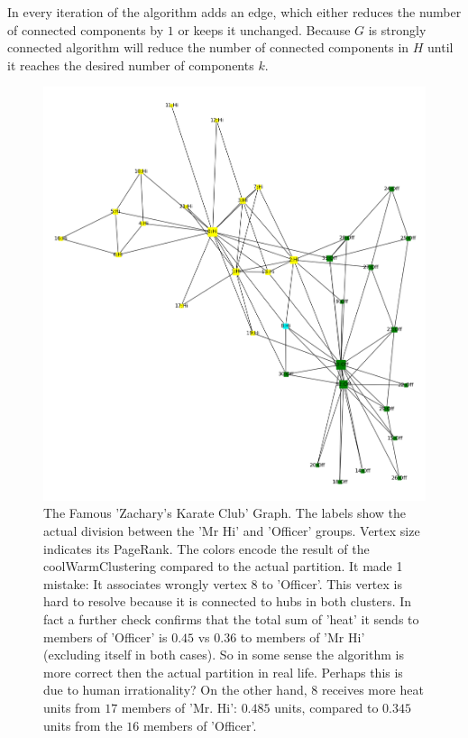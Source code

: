 \documentclass[a4paper,10pt]{article}
\theoremstyle{definition}
\theoremstyle{remark}
\theoremstyle{plain}
\begin{document}
In every iteration of the algorithm adds an edge, which either reduces the
number of connected components by $1$ or keeps it unchanged. Because $G$ is
strongly connected algorithm will reduce the number of connected
components in $H$ until it reaches the desired number of components $k$.

\begin{figure}[!htb]
\centering
\includegraphics[width=0.75\linewidth]{Karate_coolwarmclustering.png}
\caption{
The Famous 'Zachary's Karate Club' Graph. The labels show the actual division
between the 'Mr Hi' and 'Officer' groups.
Vertex size indicates its PageRank.
The colors encode the result of the coolWarmClustering compared to the actual
partition. It made 1 mistake:
It associates wrongly vertex 8 to 'Officer'.  This vertex
is hard to resolve because it is connected to hubs in both clusters.
In fact a further check confirms that the total sum of 'heat' it sends to members of
'Officer' is $0.45$ vs $0.36$ to members of 'Mr Hi' (excluding itself in both
cases). So in some sense the algorithm is more correct then the actual
partition in real life. Perhaps this is due to human irrationality?
On the other hand, $8$ receives more heat units from $17$ members of 'Mr. Hi': $0.485$
units, compared to $0.345$ units from the $16$ members of 'Officer'. 
}
\label{fig:karatecoolwarm}
\end{figure}
\end{document}
